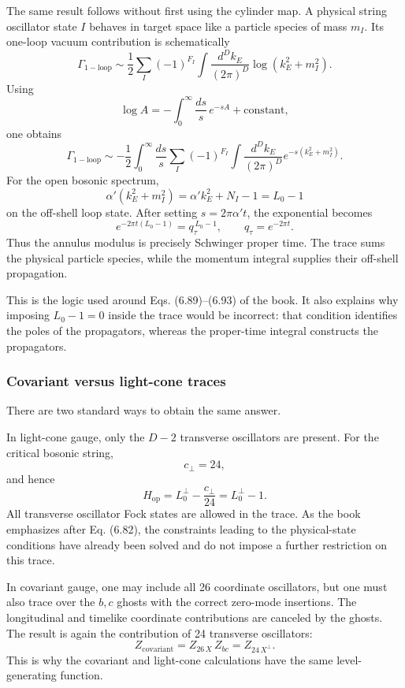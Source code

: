 \documentclass[
  10pt,
  a4paper,
  openany]{book}
\begin{document}
The same result follows without first using the cylinder map. A physical
string oscillator state \(I\) behaves in target space like a particle
species of mass \(m_I\). Its one-loop vacuum contribution is
schematically \[
\Gamma_{\mathrm{1-loop}}
\sim
\frac12
\sum_I(-1)^{F_I}
\int\frac{d^Dk_E}{(2\pi)^D}
\log(k_E^2+m_I^2).
\] Using \[
\log A
=
-\int_0^\infty\frac{ds}{s}\,e^{-sA}
+\text{constant},
\] one obtains \[
\Gamma_{\mathrm{1-loop}}
\sim
-\frac12
\int_0^\infty\frac{ds}{s}
\sum_I(-1)^{F_I}
\int\frac{d^Dk_E}{(2\pi)^D}
e^{-s(k_E^2+m_I^2)}.
\] For the open bosonic spectrum, \[
\alpha'(k_E^2+m_I^2)
=
\alpha'k_E^2+N_I-1
=
L_0-1
\] on the off-shell loop state. After setting \(s=2\pi\alpha't\), the
exponential becomes \[
e^{-2\pi t(L_0-1)}
=q_\tau^{\,L_0-1},
\qquad
q_\tau=e^{-2\pi t}.
\] Thus the annulus modulus is precisely Schwinger proper time. The
trace sums the physical particle species, while the momentum integral
supplies their off-shell propagation.

This is the logic used around Eqs. (6.89)--(6.93) of the book. It also
explains why imposing \(L_0-1=0\) inside the trace would be incorrect:
that condition identifies the poles of the propagators, whereas the
proper-time integral constructs the propagators.

\subsubsection{Covariant versus light-cone
traces}\label{covariant-versus-light-cone-traces}

There are two standard ways to obtain the same answer.

In light-cone gauge, only the \(D-2\) transverse oscillators are
present. For the critical bosonic string, \[
c_\perp=24,
\] and hence \[
H_{\mathrm{op}}
=
L_0^\perp-\frac{c_\perp}{24}
=
L_0^\perp-1.
\] All transverse oscillator Fock states are allowed in the trace. As
the book emphasizes after Eq. (6.82), the constraints leading to the
physical-state conditions have already been solved and do not impose a
further restriction on this trace.

In covariant gauge, one may include all 26 coordinate oscillators, but
one must also trace over the \(b,c\) ghosts with the correct zero-mode
insertions. The longitudinal and timelike coordinate contributions are
canceled by the ghosts. The result is again the contribution of 24
transverse oscillators: \[
Z_{\mathrm{covariant}}
=
Z_{26\,X}\,Z_{bc}
=
Z_{24\,X^\perp}.
\] This is why the covariant and light-cone calculations have the same
level-generating function.
\end{document}
